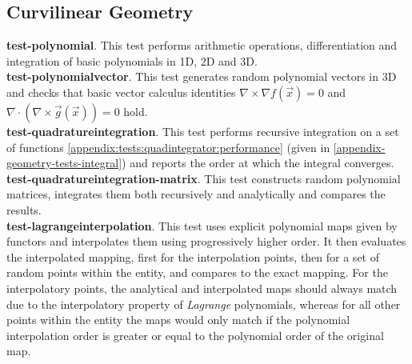 
\subsection{Curvilinear Geometry}
\label{sec:tests:curvgeom}

\noindent
\textbf{test-polynomial}. This test performs arithmetic operations, differentiation and integration of basic polynomials in 1D, 2D and 3D. \\

\noindent
\textbf{test-polynomialvector}. This test generates random polynomial vectors in 3D and checks that basic vector calculus identities $\nabla \times \nabla f(\vec{x}) = 0$ and $\nabla \cdot (\nabla \times \vec{g}(\vec{x})) = 0$ hold. \\

\noindent
\textbf{test-quadratureintegration}. This test performs recursive integration on a set of functions \cref{appendix:tests:quadintegrator:performance} (given in  \cref{appendix-geometry-tests-integral}) and reports the order at which the integral converges. \\

\noindent
\textbf{test-quadratureintegration-matrix}. This test constructs random polynomial matrices, integrates them both recursively and analytically and compares the results. \\

\noindent
\textbf{test-lagrangeinterpolation}. This test uses explicit polynomial maps given by functors and interpolates them using progressively higher order. It then evaluates the interpolated mapping, first for the interpolation points, then for a set of random points within the entity, and compares to the exact mapping. For the interpolatory points, the analytical and interpolated maps should always match due to the interpolatory property of \textit{Lagrange} polynomials, whereas for all other points within the entity the maps would only match if the polynomial interpolation order is greater or equal to the polynomial order of the original map. \\

